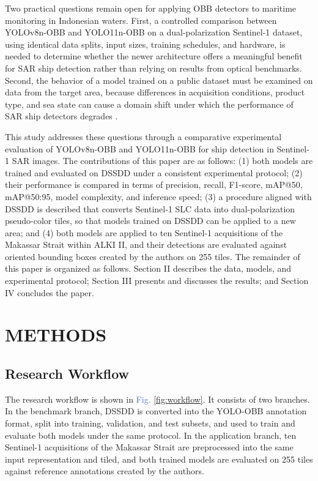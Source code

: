 \documentclass[conference]{IEEEtran}
\begin{document}
Two practical questions remain open for applying OBB detectors to maritime monitoring in Indonesian waters. First, a controlled comparison between YOLOv8n-OBB and YOLO11n-OBB on a dual-polarization Sentinel-1 dataset, using identical data splits, input sizes, training schedules, and hardware, is needed to determine whether the newer architecture offers a meaningful benefit for SAR ship detection rather than relying on results from optical benchmarks. Second, the behavior of a model trained on a public dataset must be examined on data from the target area, because differences in acquisition conditions, product type, and sea state can cause a domain shift under which the performance of SAR ship detectors degrades \cite{tu2025mamba,yang2024uda}.

This study addresses these questions through a comparative experimental evaluation of YOLOv8n-OBB and YOLO11n-OBB for ship detection in Sentinel-1 SAR images. The contributions of this paper are as follows: (1) both models are trained and evaluated on DSSDD under a consistent experimental protocol; (2) their performance is compared in terms of precision, recall, F1-score, mAP@50, mAP@50:95, model complexity, and inference speed; (3) a procedure aligned with DSSDD is described that converts Sentinel-1 SLC data into dual-polarization pseudo-color tiles, so that models trained on DSSDD can be applied to a new area; and (4) both models are applied to ten Sentinel-1 acquisitions of the Makassar Strait within ALKI II, and their detections are evaluated against oriented bounding boxes created by the authors on 255 tiles. The remainder of this paper is organized as follows. Section II describes the data, models, and experimental protocol; Section III presents and discusses the results; and Section IV concludes the paper.

\section{METHODS}
\subsection{Research Workflow}
The research workflow is shown in \textcolor{RoyalBlue}{Fig.} \ref{fig:workflow}. It consists of two branches. In the benchmark branch, DSSDD is converted into the YOLO-OBB annotation format, split into training, validation, and test subsets, and used to train and evaluate both models under the same protocol. In the application branch, ten Sentinel-1 acquisitions of the Makassar Strait are preprocessed into the same input representation and tiled, and both trained models are evaluated on 255 tiles against reference annotations created by the authors.
\end{document}
